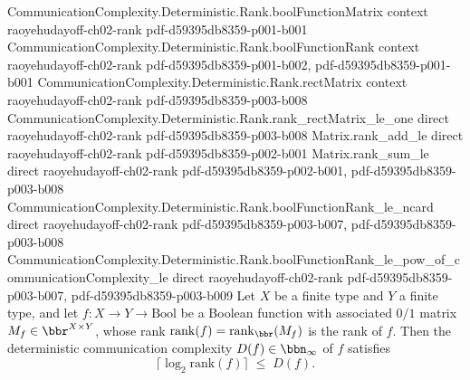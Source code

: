 \begin{theorem}
  {CommunicationComplexity.Deterministic.Rank.boolFunctionMatrix}
  {context}
  {raoyehudayoff-ch02-rank}
  {pdf-d59395db8359-p001-b001}
\proofstep
  {CommunicationComplexity.Deterministic.Rank.boolFunctionRank}
  {context}
  {raoyehudayoff-ch02-rank}
  {pdf-d59395db8359-p001-b002,
    pdf-d59395db8359-p001-b001}
\proofstep
  {CommunicationComplexity.Deterministic.Rank.rectMatrix}
  {context}
  {raoyehudayoff-ch02-rank}
  {pdf-d59395db8359-p003-b008}
\proofstep
  {CommunicationComplexity.Deterministic.Rank.rank_rectMatrix_le_one}
  {direct}
  {raoyehudayoff-ch02-rank}
  {pdf-d59395db8359-p003-b008}
\proofstep
  {Matrix.rank_add_le}
  {direct}
  {raoyehudayoff-ch02-rank}
  {pdf-d59395db8359-p002-b001}
\proofstep
  {Matrix.rank_sum_le}
  {direct}
  {raoyehudayoff-ch02-rank}
  {pdf-d59395db8359-p002-b001,
    pdf-d59395db8359-p003-b008}
\proofstep
  {CommunicationComplexity.Deterministic.Rank.boolFunctionRank_le_ncard}
  {direct}
  {raoyehudayoff-ch02-rank}
  {pdf-d59395db8359-p003-b007,
    pdf-d59395db8359-p003-b008}
\proofstep
  {CommunicationComplexity.Deterministic.Rank.boolFunctionRank_le_pow_of_communicationComplexity_le}
  {direct}
  {raoyehudayoff-ch02-rank}
  {pdf-d59395db8359-p003-b007,
    pdf-d59395db8359-p003-b009}
Let $X$ be a finite type and $Y$ a finite type, and let $f : X \to Y \to \mathrm{Bool}$
be a Boolean function with associated $0/1$ matrix $M_f \in \bbr^{X \times Y}$, whose
rank $\mathrm{rank}(f) = \mathrm{rank}_{\bbr}(M_f)$ is the rank of $f$. Then the
deterministic communication complexity $D(f) \in \bbn_\infty$ of $f$ satisfies
\[
  \lceil \log_2 \mathrm{rank}(f) \rceil \;\le\; D(f).
\]
\end{theorem}

